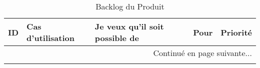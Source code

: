 \begin{center}
    \footnotesize
    \setlength\LTleft{-20pt}
    \begin{longtable}{| l | p{3.5cm} | p{5.5cm} | p{5cm} | l |}
 \caption{Backlog du Produit}
 \label{tab:product-backlog} \\

 \hline
 \textbf{ID} & \textbf{Cas d'utilisation} & \textbf{Je veux qu'il soit possible de} & \textbf{Pour} & \textbf{Priorité} \\ \hline
 \endhead

 \hline \multicolumn{5}{|r|}{{Continué en page suivante$\dotsc$}} \\ \hline
 \endfoot

 \hline \hline
 \endlastfoot

\hline


\end{longtable}
\end{center}
